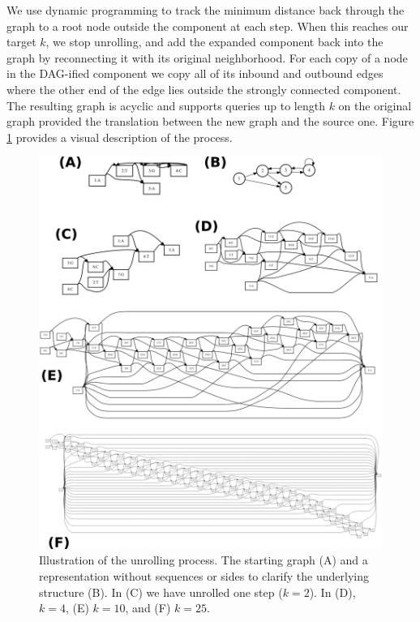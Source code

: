 \documentclass[12pt]{article}
\begin{document}
We use dynamic programming to track the minimum distance back through the graph to a root node outside the component at each step.
When this reaches our target $k$, we stop unrolling, and add the expanded component back into the graph by reconnecting it with its original neighborhood.
For each copy of a node in the DAG-ified component we copy all of its inbound and outbound edges where the other end of the edge lies outside the strongly connected component.
The resulting graph is acyclic and supports queries up to length $k$ on the original graph provided the translation between the new graph and the source one.
Figure \ref{fig:kdagify} provides a visual description of the process.

\begin{figure}[t]
\centering
\includegraphics[width=1.0\textwidth]{figures/kdagify}
\caption{\label{fig:kdagify}
  Illustration of the unrolling process. The starting graph (A) and a representation without sequences or sides to clarify the underlying structure (B).
  In (C) we have unrolled one step ($k = 2$). In (D), $k = 4$, (E) $k = 10$, and (F) $k = 25$.
}
\end{figure}
\end{document}

